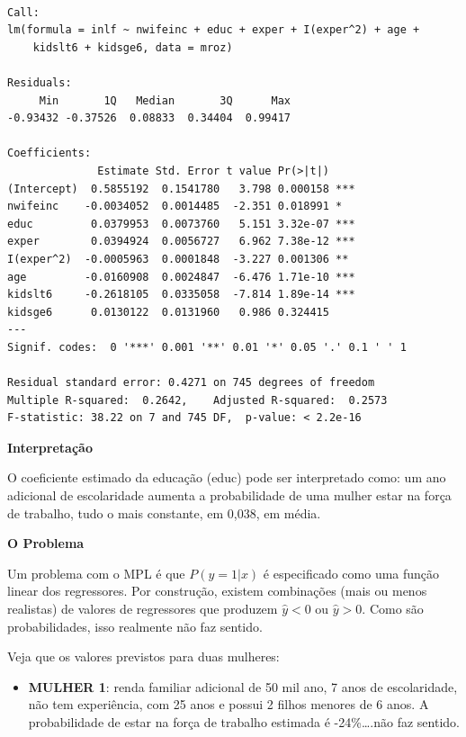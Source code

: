 \documentclass[
  letterpaper,
  DIV=11,
  numbers=noendperiod]{scrreprt}
\providecommand{\tightlist}{%
  \setlength{\itemsep}{0pt}\setlength{\parskip}{0pt}}
\begin{document}
\begin{verbatim}

Call:
lm(formula = inlf ~ nwifeinc + educ + exper + I(exper^2) + age + 
    kidslt6 + kidsge6, data = mroz)

Residuals:
     Min       1Q   Median       3Q      Max 
-0.93432 -0.37526  0.08833  0.34404  0.99417 

Coefficients:
              Estimate Std. Error t value Pr(>|t|)    
(Intercept)  0.5855192  0.1541780   3.798 0.000158 ***
nwifeinc    -0.0034052  0.0014485  -2.351 0.018991 *  
educ         0.0379953  0.0073760   5.151 3.32e-07 ***
exper        0.0394924  0.0056727   6.962 7.38e-12 ***
I(exper^2)  -0.0005963  0.0001848  -3.227 0.001306 ** 
age         -0.0160908  0.0024847  -6.476 1.71e-10 ***
kidslt6     -0.2618105  0.0335058  -7.814 1.89e-14 ***
kidsge6      0.0130122  0.0131960   0.986 0.324415    
---
Signif. codes:  0 '***' 0.001 '**' 0.01 '*' 0.05 '.' 0.1 ' ' 1

Residual standard error: 0.4271 on 745 degrees of freedom
Multiple R-squared:  0.2642,    Adjusted R-squared:  0.2573 
F-statistic: 38.22 on 7 and 745 DF,  p-value: < 2.2e-16
\end{verbatim}

\textbf{Interpretação}

O coeficiente estimado da educação (educ) pode ser interpretado como: um
ano adicional de escolaridade aumenta a probabilidade de uma mulher
estar na força de trabalho, tudo o mais constante, em 0,038, em média.

\textbf{O Problema}

Um problema com o MPL é que \(P(y = 1|x)\) é especificado como uma
função linear dos regressores. Por construção, existem combinações (mais
ou menos realistas) de valores de regressores que produzem
\(\hat{y} < 0\) ou \(\hat{y}>0\). Como são probabilidades, isso
realmente não faz sentido.

Veja que os valores previstos para duas mulheres:

\begin{itemize}
\tightlist
\item
  \textbf{MULHER 1}: renda familiar adicional de 50 mil ano, 7 anos de
  escolaridade, não tem experiência, com 25 anos e possui 2 filhos
  menores de 6 anos. A probabilidade de estar na força de trabalho
  estimada é -24\%\ldots.não faz sentido.
\end{itemize}
\end{document}

